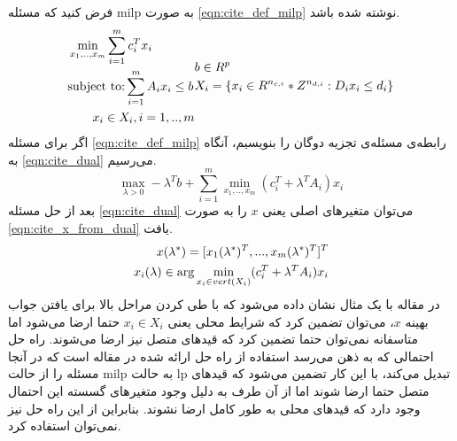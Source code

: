 	فرض کنید که مسئله milp به صورت \cref{eqn:cite_def_milp} نوشته شده باشد. 
	\begin{subequations}
		\begin{align}\label{eqn:cite_def_milp}
			&\min_{x_1,..,x_m} \sum_{i=1}^m c_i^Tx_i \notag \\
			&\text{subject to:} \sum_{i=1}^m A_ix_i \le b \notag \\
			&\quad\quad x_i \in X_i, i = 1,..,m
		\end{align}
		\begin{align}
			&b \in R^p \notag \\
			&X_i = \{x_i\in R^{n_{c,i}}*Z^{n_{d,i}}:D_ix_i \le d_i\}
		\end{align}
	\end{subequations}
	اگر برای مسئله \cref{eqn:cite_def_milp} رابطه‌ی مسئله‌ی تجزیه دوگان را بنویسیم، آنگاه به \cref{eqn:cite_dual}  می‌رسیم. 
	\begin{equation}\label{eqn:cite_dual}
		\max_{\lambda > 0} -\lambda^Tb + \sum_{i=1}^m \min_{x_1,..,x_m}(c_i^T + \lambda^TA_i)x_i
	\end{equation}
	بعد از حل مسئله \cref{eqn:cite_dual} می‌توان متغیرهای اصلی یعنی $x$ را به صورت \cref{eqn:cite_x_from_dual} یافت. 
	\begin{align}\label{eqn:cite_x_from_dual}
		x(\lambda^*) = [x_1(\lambda^*)^T, ..., x_m(\lambda^*)^T]^T \notag \\
		x_i(\lambda) \in \arg \min_{x_i \in vert(X_i)} (c_i^T + \lambda^TA_i)x_i
	\end{align}
	در مقاله \cite{decentralized_approach} با یک مثال نشان داده می‌شود که با طی کردن مراحل بالا برای یافتن جواب بهینه $x$، می‌توان تضمین کرد که شرایط محلی یعنی $x_i \in X_i$ حتما ارضا می‌شود اما متاسفانه نمی‌توان حتما تضمین کرد که قیدهای متصل نیز ارضا می‌شوند. راه حل احتمالی که به ذهن می‌رسد استفاده از راه حل ارائه شده در مقاله \cite{shor} است که در آنجا مسئله را از حالت milp به حالت lp تبدیل می‌کند، با این کار تضمین می‌شود که قیدهای متصل حتما ارضا شوند اما از آن طرف به دلیل وجود متغیرهای گسسته این احتمال وجود دارد که قیدهای محلی به طور کامل ارضا نشوند. بنابراین از این راه حل نیز نمی‌توان استفاده کرد. 
	
